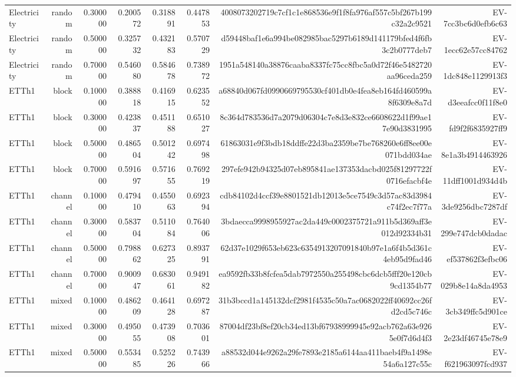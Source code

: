 \begin{tabular}{lrrrrrrr}
Electricity & random & 0.300000 & 0.200572 & 0.318891 & 0.447853 & 4008073202719c7cf1c1e868536e9f1f8fa976af557c5bf267b199c32a2c9521 & EV-7cc3bc6d0efb6c63 \\
Electricity & random & 0.500000 & 0.325732 & 0.432183 & 0.570729 & d59448baf1e6a994be082985bac5297b6189d141179bfed4f6fb3c2b0777deb7 & EV-1ecc62e57cc84762 \\
Electricity & random & 0.700000 & 0.546080 & 0.584678 & 0.738972 & 1951a548140a38876caaba8337fc75cc8fbc5a0d72f46e5482720aa96ceda259 & EV-1dc848e1129913f3 \\
ETTh1 & block & 0.100000 & 0.388818 & 0.416915 & 0.623552 & a68840d067fd0990669795530cf401db0e4fea8eb164fd460599a8f6309e8a7d & EV-d3eeafcc0f11f8e0 \\
ETTh1 & block & 0.300000 & 0.423837 & 0.451188 & 0.651027 & 8c364d783536d7a2079d06304c7e8d3e832ce6608622d1f99ae17e90d3831995 & EV-fd9f2f6835927ff9 \\
ETTh1 & block & 0.500000 & 0.486504 & 0.501242 & 0.697498 & 61863031e9f3bdb18ddffe22d3ba2359be7be768260e6ff8ee00e071bdd034ae & EV-8e1a3b4914463926 \\
ETTh1 & block & 0.700000 & 0.591697 & 0.571655 & 0.769219 & 297efe942b94325d07eb895841ae137353dacbd025f81297722f0716efacbf4e & EV-11dff1001d934d4b \\
ETTh1 & channel & 0.100000 & 0.479410 & 0.455063 & 0.692394 & cdb84102d4ccf39e8801521db12013e5ce7549c3d57ac83d3984c74f2ec7f77a & EV-3de9256dbc7287df \\
ETTh1 & channel & 0.300000 & 0.583704 & 0.511084 & 0.764006 & 3bdaecca9998955927ac2da449c0002375721a911b5d369aff3e012d92334b31 & EV-299e747dcb0dadac \\
ETTh1 & channel & 0.500000 & 0.798862 & 0.627325 & 0.893791 & 62d37e1029f653eb623c6354913207091840b97e1a6f4b5d361c4eb95d9fad46 & EV-ef537862f3efbc06 \\
ETTh1 & channel & 0.700000 & 0.900947 & 0.683061 & 0.949182 & ea9592fb33b8fcfea5dab7972550a255498cbc6dcb5fff20e120cb9cd1354b77 & EV-029b8e14a8da4953 \\
ETTh1 & mixed & 0.100000 & 0.486209 & 0.464128 & 0.697287 & 31b3bccd1a145132dcf2981f4535c50a7ac0682022ff40692cc26fd2cd5c746c & EV-3cb349ffc5d901ce \\
ETTh1 & mixed & 0.300000 & 0.495055 & 0.473908 & 0.703601 & 87004df23bf8ef20cb34ed13bf67938999945e92acb762a63e9265e0f7d6d4f3 & EV-2e23df46745e78e9 \\
ETTh1 & mixed & 0.500000 & 0.553485 & 0.525226 & 0.743966 & a88532d044e9262a29fe7893e2185a6144aa411baeb4f9a1498e54a6a127c55c & EV-f621963097fcd937 \\

\end{tabular}
